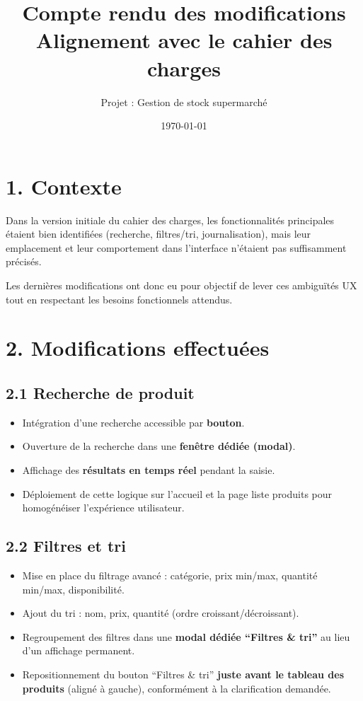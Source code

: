 \documentclass[12pt,a4paper]{article}
\title{Compte rendu des modifications\\
\large Alignement avec le cahier des charges}
\author{Projet : Gestion de stock supermarché}
\date{\today}
\begin{document}
\maketitle

\section*{1. Contexte}
Dans la version initiale du cahier des charges, les fonctionnalités principales étaient bien identifiées (recherche, filtres/tri, journalisation), mais leur emplacement et leur comportement dans l'interface n'étaient pas suffisamment précisés.

Les dernières modifications ont donc eu pour objectif de lever ces ambiguïtés UX tout en respectant les besoins fonctionnels attendus.

\section*{2. Modifications effectuées}

\subsection*{2.1 Recherche de produit}
\begin{itemize}[leftmargin=1.2cm]
  \item Intégration d'une recherche accessible par \textbf{bouton}.
  \item Ouverture de la recherche dans une \textbf{fenêtre dédiée (modal)}.
  \item Affichage des \textbf{résultats en temps réel} pendant la saisie.
  \item Déploiement de cette logique sur l'accueil et la page liste produits pour homogénéiser l'expérience utilisateur.
\end{itemize}

\subsection*{2.2 Filtres et tri}
\begin{itemize}[leftmargin=1.2cm]
  \item Mise en place du filtrage avancé : catégorie, prix min/max, quantité min/max, disponibilité.
  \item Ajout du tri : nom, prix, quantité (ordre croissant/décroissant).
  \item Regroupement des filtres dans une \textbf{modal dédiée ``Filtres \& tri''} au lieu d'un affichage permanent.
  \item Repositionnement du bouton ``Filtres \& tri'' \textbf{juste avant le tableau des produits} (aligné à gauche), conformément à la clarification demandée.
\end{itemize}
\end{document}
